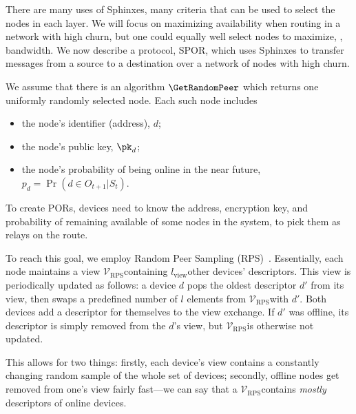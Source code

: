 There are many uses of Sphinxes, many criteria that can be used to select the 
nodes in each layer.
We will focus on maximizing availability when routing in a network with high 
churn, but one could equally well select nodes to maximize, \eg, bandwidth.
We now describe a protocol, \ac{SPOR}, which uses Sphinxes to transfer messages 
from a source to a destination over a network of nodes with high churn.


We assume that there is an algorithm \(\GetRandomPeer\) which returns one 
uniformly randomly selected node.
Each such node includes
\begin{itemize}
  \item the node's identifier (address), \(d\);
  \item the node's public key, \(\pk_d\);
  \item the node's probability of being online in the near future, \(p_d = 
      \Pr\left(d \in O_{t+1} | S_t\right)\).
\end{itemize}


\newcommand{\viewsize}{\ensuremath{l_{\text{view}}\xspace}}
\newcommand{\view}{\ensuremath{\mathcal{V}_{\text{RPS}}\xspace}}
\NewAlgorithm{\GetRandomPeer}{\text{random descriptor from }\view}

To create PORs, devices need to know the address, encryption key, and probability of remaining available of some nodes in the system, to pick them as relays on the route.

To reach this goal, we employ Random Peer Sampling (RPS)~\cite{Voulgaris_Gavidia_van_Steen_2005,Jelasity_Voulgaris_Guerraoui_Kermarrec_van_Steen_2007}.
Essentially, each node maintains a view \view containing \viewsize other devices' descriptors. 
This view is periodically updated as follows: a device $d$ pops the oldest descriptor $d'$ from its view, then swaps a predefined number of $l$ elements from \view with $d'$.
Both devices add a descriptor for themselves to the view exchange.
If $d'$ was offline, its descriptor is simply removed from the $d$'s view, but \view is otherwise not updated.

This allows for two things: firstly, each device's view contains a constantly changing random sample of the whole set of devices;
secondly, offline nodes get removed from one's view fairly fast---we can say that a \view contains \emph{mostly} descriptors of online devices.

